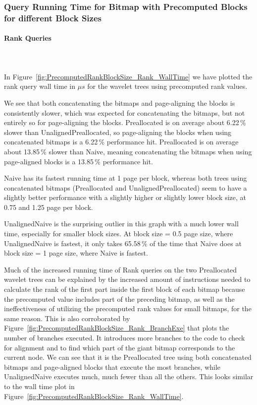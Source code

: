 \subsubsection{Query Running Time for Bitmap with Precomputed Blocks for different Block Sizes}
\label{sec:queryRunTimePrecomputedBlockSizes}

\paragraph{Rank Queries}~\\\\
In Figure~\ref{fig:PrecomputedRankBlockSize_Rank_WallTime} we have plotted the rank query wall time in $\mu s$ for the wavelet trees using precomputed rank values.

We see that both concatenating the bitmaps and page-aligning the blocks is consistently slower, which was expected for concatenating the bitmaps, but not entirely so for page-aligning the blocks.
Preallocated is on average about 6.22\,\% slower than UnalignedPreallocated, so page-aligning the blocks when using concatenated bitmaps is a 6.22\,\% performance hit.
Preallocated is on average about 13.85\,\% slower than Naive, meaning concatenating the bitmaps when using page-aligned blocks is a 13.85\,\% performance hit.

Naive has its fastest running time at 1 page per block, whereas both trees using concatenated bitmaps (Preallocated and UnalignedPreallocated) seem to have a slightly better performance with a slightly higher or slightly lower block size, at 0.75 and 1.25 page per block.

UnalignedNaive is the surprising outlier in this graph with a much lower wall time, especially for smaller block sizes.
At block size = 0.5 page size, where UnalignedNaive is fastest, it only takes 65.58\,\% of the time that Naive does at block size = 1 page size, where Naive is fastest.

Much of the increased running time of Rank queries on the two Preallocated wavelet trees can be explained by the increased amount of instructions needed to calculate the rank of the first part inside the first block of each bitmap because the precomputed value includes part of the preceding bitmap, as well as the ineffectiveness of utilizing the precomputed rank values for small bitmaps, for the same reason.
This is also corroborated by Figure~\ref{fig:PrecomputedRankBlockSize_Rank_BranchExe} that plots the number of branches executed.
It introduces more branches to the code to check for alignment and to find which part of the giant bitmap corresponds to the current node.
We can see that it is the Preallocated tree using both concatenated bitmaps and page-aligned blocks that execute the most branches, while UnalignedNaive executes much, much fewer than all the others.
This looks similar to the wall time plot in Figure~\ref{fig:PrecomputedRankBlockSize_Rank_WallTime}.

